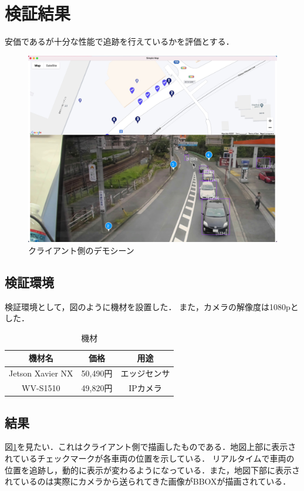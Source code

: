 \documentclass[technicalreport]{ieicej}
\begin{document}
\section{検証結果}
安価であるが十分な性能で追跡を行えているかを評価とする．
\begin{figure}[t]
  \includegraphics*[bb=0 0 3000 2200, width=1\linewidth]{./images/demo.jpg}
  \caption{クライアント側のデモシーン}
  \label{tab:demo}
  \end{figure}
  
\subsection{検証環境}
検証環境として，図のように機材を設置した．
また，カメラの解像度は1080pとした．
\begin{table}[htb]
  \begin{center}
    \caption{機材}
    \begin{tabular}{|c|c|c|} \hline
      機材名 &  価格 & 用途 \\ \hline \hline
      Jetson Xavier NX  & 50,490円 & エッジセンサ \\ \hline 
      WV-S1510 & 49,820円 & IPカメラ \\ \hline
    \end{tabular}
  \end{center}
\end{table}

\subsection{結果}
図\ref{tab:demo}を見たい．これはクライアント側で描画したものである．地図上部に表示されているチェックマークが各車両の位置を示している．
リアルタイムで車両の位置を追跡し，動的に表示が変わるようになっている．また，地図下部に表示されているのは実際にカメラから送られてきた画像がBBOXが描画されている．
\end{document}
